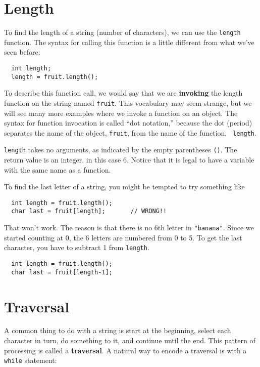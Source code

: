 \section{Length}

To find the length of a string (number of characters), we can
use the {\tt length} function.  The syntax for calling this
function is a little different from what we've seen before:

\begin{verbatim}
  int length;
  length = fruit.length();
\end{verbatim}
%
To describe this function call, we would say that we are {\bf
invoking} the length function on the string named {\tt fruit}.  This
vocabulary may seem strange, but we will see many more examples where
we invoke a function on an object.  The syntax for function invocation
is called ``dot notation,'' because the dot (period) separates the
name of the object, {\tt fruit}, from the name of the function, {\tt
length}.

{\tt length} takes no arguments, as indicated by the empty parentheses
{\tt ()}.  The return value is an integer, in this case 6.  Notice
that it is legal to have a variable with the same name as a function.

To find the last letter of a string, you might be tempted to
try something like

\begin{verbatim}
  int length = fruit.length();
  char last = fruit[length];       // WRONG!!
\end{verbatim}
%
That won't work.  The reason is that there is no 6th letter
in {\tt "banana"}.  Since we started counting at 0, the 6
letters are numbered from 0 to 5.  To get the last character,
you have to subtract 1 from {\tt length}.

\begin{verbatim}
  int length = fruit.length();
  char last = fruit[length-1];
\end{verbatim}

\section{Traversal}

A common thing to do with a string is
start at the beginning, select each character in turn, do
something to it, and continue until the end.  This pattern
of processing is called a {\bf traversal}.  A natural
way to encode a traversal is with a {\tt while} statement:

